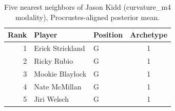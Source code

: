 \begin{table}[htbp]
  \centering\small
  \begin{tabular}{rllc}
    \toprule
    Rank & Player & Position & Archetype \\
    \midrule
    1 & Erick Strickland & G & 1 \\
    2 & Ricky Rubio & G & 1 \\
    3 & Mookie Blaylock & G & 1 \\
    4 & Nate McMillan & G & 1 \\
    5 & Jiri Welsch & G & 1 \\
    \bottomrule
  \end{tabular}
  \caption{Five nearest neighbors of Jason Kidd (curvature_m4 modality), Procrustes-aligned posterior mean.}
  \label{tab:Jason_Kidd_neighbors_curvature_m4}
\end{table}

